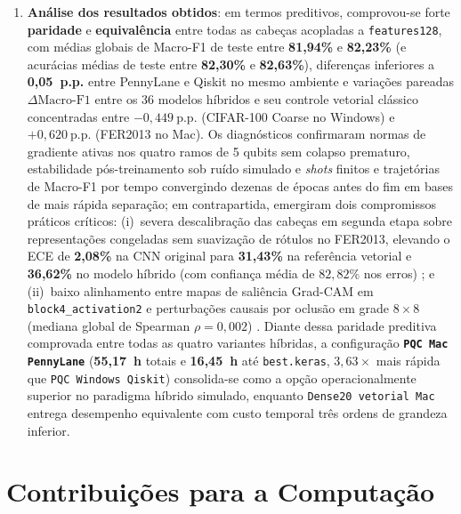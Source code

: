 \documentclass[
    12pt,
    openright,
    oneside,
    a4paper,
    english,
    brazil
]{abntex2}
\begin{document}
\begin{enumerate}
    \item \textbf{Análise dos resultados obtidos}: em termos preditivos, comprovou-se forte \textbf{paridade} e \textbf{equivalência} entre todas as cabeças acopladas a \texttt{features128}, com médias globais de Macro-F1 de teste entre \textbf{81,94\%} e \textbf{82,23\%} (e acurácias médias de teste entre \textbf{82,30\%} e \textbf{82,63\%}), diferenças inferiores a \textbf{0,05~p.p.} entre PennyLane e Qiskit no mesmo ambiente e variações pareadas \(\Delta\text{Macro-F1}\) entre os 36 modelos híbridos e seu controle vetorial clássico concentradas entre \textbf{\(-0{,}449~\text{p.p.}\)} (CIFAR-100 Coarse no Windows) e \textbf{\(+0{,}620~\text{p.p.}\)} (FER2013 no Mac). Os diagnósticos confirmaram normas de gradiente ativas nos quatro ramos de 5 qubits sem colapso prematuro, estabilidade pós-treinamento sob ruído simulado e \textit{shots} finitos e trajetórias de Macro-F1 por tempo convergindo dezenas de épocas antes do fim em bases de mais rápida separação; em contrapartida, emergiram dois compromissos práticos críticos: (i)~severa descalibração das cabeças em segunda etapa sobre representações congeladas sem suavização de rótulos no FER2013, elevando o ECE de \textbf{2,08\%} na CNN original para \textbf{31,43\%} na referência vetorial e \textbf{36,62\%} no modelo híbrido (com confiança média de \(82{,}82\%\) nos erros) \cite{guo2017calibration}; e (ii)~baixo alinhamento entre mapas de saliência Grad-CAM em \texttt{block4\_activation2} e perturbações causais por oclusão em grade \(8 \times 8\) (mediana global de Spearman \textbf{\(\rho = 0{,}002\)}) \cite{adebayo2018sanity}. Diante dessa paridade preditiva comprovada entre todas as quatro variantes híbridas, a configuração \textbf{\texttt{PQC Mac PennyLane}} (\textbf{55,17~h} totais e \textbf{16,45~h} até \texttt{best.keras}, \(3{,}63\times\) mais rápida que \texttt{PQC Windows Qiskit}) consolida-se como a opção operacionalmente superior no paradigma híbrido simulado, enquanto \texttt{Dense20 vetorial Mac} entrega desempenho equivalente com custo temporal três ordens de grandeza inferior.
\end{enumerate}

\section{Contribuições para a Computação}
\end{document}
